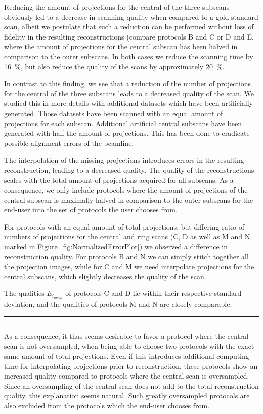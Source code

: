Reducing the amount of projections for the central of the three subscans obviously led to a decrease in scanning quality when compared to a gold-standard scan, albeit we postulate that such a reduction can be performed without loss of fidelity in the resulting reconstructions (compare \eg  protocols B and C or D and E, where the amount of projections for the central subscan has been halved in comparison to the outer subscans. In both cases we reduce the scanning time by  \SI{16}{\percent}, but also reduce the quality of the scans by approximately \SI{20}{\percent}. %

In contrast to this finding, we see that a reduction of the number of projections for the central of the three subscans leads to a decreased quality of the scan. We studied this in more details with additional datasets which have been artificially generated. Those datasets have been scanned with an equal amount of projections for each subscan. Additional artificial central subscans have been generated with half the amount of projections. This has been done to eradicate possible alignment errors of the beamline.

The interpolation of the missing projections introduces errors in the resulting reconstruction, leading to a decreased quality. The quality of the reconstructions scales with the total amount of projections acquired for all subscans. As a consequence, we only include protocols where the amount of projections of the central subscan is maximally halved in comparison to the outer subscans for the end-user into the set of protocols the user chooses from.

For protocols with an equal amount of total projections, but differing ratio of  numbers of projections for the central and ring scans (C, D as well as M and N, marked in Figure~\ref{fig:NormalizedErrorPlot}) we observed a difference in reconstruction quality. For protocols B and N we can simply stitch together all the projection images, while for C and M we need interpolate projections for the central subscans, which slightly decreases the quality of the scan.

The qualities $E_{i_{norm}}$ of protocols C and D lie within their respective standard deviation, and the qualities of protocols M and N are closely comparable. 

\hrule
{}
\hrule

As a consequence, it thus seems desirable to favor a protocol where the central scan is not oversampled, when being able to choose two protocols with the exact same amount of total projections. Even if this introduces additional computing time for interpolating projections prior to reconstruction, these protocols show an increased quality compared to protocols where the central scan is oversampled. Since an oversampling of the central scan does not add to the total reconstruction quality, this explanation seems natural. Such greatly oversampled protocols are also excluded from the protocols which the end-user chooses from.

